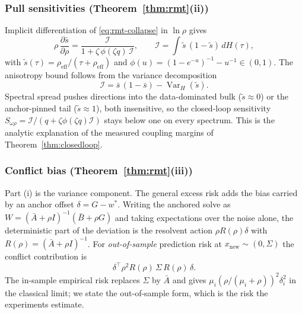 \subsubsection{Pull sensitivities (Theorem~\ref{thm:rmt}(ii))}
\label{app:rmt-sensitivity}

Implicit differentiation of \eqref{eq:rmt-collapse} in $\ln\rho$ gives
\begin{equation}
\label{eq:rmt-sensitivity}
\rho\,\frac{\partial \bar s}{\partial \rho}
= \frac{\mathcal{I}}{1 + \zeta\,\phi(\zeta q)\,\mathcal{I}},
\qquad
\mathcal{I} = \int \tilde s\,(1 - \tilde s)\, dH(\tau),
\end{equation}
with $\tilde s(\tau) = \rho_{\mathrm{eff}}/(\tau + \rho_{\mathrm{eff}})$ and $\phi(u) = (1 - e^{-u})^{-1} - u^{-1} \in (0,1)$.
The anisotropy bound follows from the variance decomposition
\begin{equation}
\label{eq:rmt-anisotropy}
\mathcal{I} = \bar s\,(1 - \bar s) - \operatorname{Var}_H(\tilde s).
\end{equation}
Spectral spread pushes directions into the data-dominated bulk ($\tilde s \approx 0$) or the anchor-pinned tail ($\tilde s \approx 1$), both insensitive, so the closed-loop sensitivity
$S_{\omega\rho} = \mathcal{I}/(q + \zeta\phi(\zeta q)\mathcal{I})$ stays below one on every spectrum.
This is the analytic explanation of the measured coupling margins of Theorem~\ref{thm:closedloop}.

\subsubsection{Conflict bias (Theorem~\ref{thm:rmt}(iii))}
\label{app:rmt-conflict}

Part (i) is the variance component.
The general excess risk adds the bias carried by an anchor offset $\delta = G - w^*$.
Writing the anchored solve as $W = (\bar A + \rho I)^{-1}(\bar B + \rho G)$ and taking expectations over the noise alone, the deterministic part of the deviation is the resolvent action $\rho R(\rho)\delta$ with $R(\rho) = (\bar A + \rho I)^{-1}$.
For \emph{out-of-sample} prediction risk at $x_{\mathrm{new}} \sim (0,\Sigma)$ the conflict contribution is
\begin{equation}
\label{eq:rmt-conflict-quadratic}
\delta^\top \rho^2 R(\rho)\,\Sigma\,R(\rho)\,\delta .
\end{equation}
The in-sample empirical risk replaces $\Sigma$ by $\bar A$ and gives $\mu_i(\rho/(\mu_i + \rho))^2\delta_i^2$ in the classical limit; we state the out-of-sample form, which is the risk the experiments estimate.

